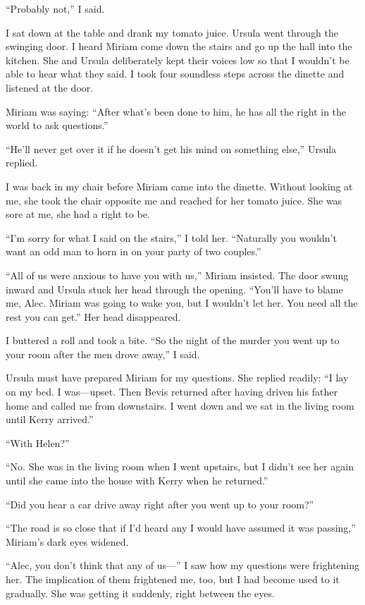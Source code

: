 \documentclass{novel}
\begin{document}
“Probably not,” I said.

I sat down at the table and drank my tomato juice. Ursula went through the swinging door. I heard Miriam come down the stairs and go up the hall into the kitchen. She and Ursula deliberately kept their voices low so that I wouldn’t be able to hear what they said. I took four soundless steps across the dinette and listened at the door.

Miriam was saying: “After what’s been done to him, he has all the right in the world to ask questions.”

“He’ll never get over it if he doesn’t get his mind on something else,” Ursula replied.

I was back in my chair before Miriam came into the dinette. Without looking at me, she took the chair opposite me and reached for her tomato juice. She was sore at me, she had a right to be.

“I’m sorry for what I said on the stairs,” I told her. “Naturally you wouldn’t want an odd man to horn in on your party of two couples.”

“All of us were anxious to have you with us,” Miriam insisted. The door swung inward and Ursula stuck her head through the opening. “You’ll have to blame me, Alec. Miriam was going to wake you, but I wouldn’t let her. You need all the rest you can get.” Her head disappeared.

I buttered a roll and took a bite. “So the night of the murder you went up to your room after the men drove away,” I said.

Ursula must have prepared Miriam for my questions. She replied readily: “I lay on my bed. I was—upset. Then Bevis returned after having driven his father home and called me from downstairs. I went down and we sat in the living room until Kerry arrived.”

“With Helen?”

“No. She was in the living room when I went upstairs, but I didn’t see her again until she came into the house with Kerry when he returned.”

“Did you hear a car drive away right after you went up to your room?”

“The road is so close that if I’d heard any I would have assumed it was passing,” Miriam’s dark eyes widened.

“Alec, you don’t think that any of us—” I saw how my questions were frightening her. The implication of them frightened me, too, but I had become used to it gradually. She was getting it suddenly, right between the eyes.
\end{document}
